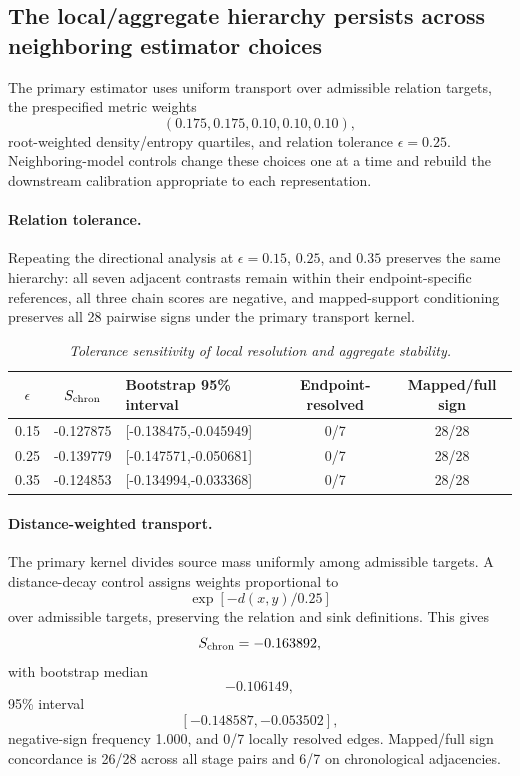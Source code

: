 \documentclass[11pt]{article}
\begin{document}
\subsection{The local/aggregate hierarchy persists across neighboring estimator choices}

The primary estimator uses uniform transport over admissible relation targets, the prespecified metric weights
\[
(0.175,0.175,0.10,0.10,0.10),
\]
root-weighted density/entropy quartiles, and relation tolerance $\epsilon=0.25$. Neighboring-model controls change these choices one at a time and rebuild the downstream calibration appropriate to each representation.

\paragraph{Relation tolerance.}
Repeating the directional analysis at $\epsilon=0.15$, $0.25$, and $0.35$ preserves the same hierarchy: all seven adjacent contrasts remain within their endpoint-specific references, all three chain scores are negative, and mapped-support conditioning preserves all 28 pairwise signs under the primary transport kernel.

\begin{table}[ht]
\centering
\caption{\textit{Tolerance sensitivity of local resolution and aggregate stability.}}
\label{tab:tolerance}
\begin{tabular}{cclcc}
\toprule
$\epsilon$ & $S_{\rm chron}$ & Bootstrap 95\% interval & Endpoint-resolved & Mapped/full sign\\
\midrule
0.15 & -0.127875 & [-0.138475,-0.045949] & 0/7 & 28/28\\
0.25 & -0.139779 & [-0.147571,-0.050681] & 0/7 & 28/28\\
0.35 & -0.124853 & [-0.134994,-0.033368] & 0/7 & 28/28\\
\bottomrule
\end{tabular}
\end{table}

\paragraph{Distance-weighted transport.}
The primary kernel divides source mass uniformly among admissible targets. A distance-decay control assigns weights proportional to
\[
\exp[-d(x,y)/0.25]
\]
over admissible targets, preserving the relation and sink definitions. This gives
\[
S_{\rm chron}=-0.163892,
\]
with bootstrap median
\[
-0.106149,
\]
95\% interval
\[
[-0.148587,-0.053502],
\]
negative-sign frequency 1.000, and 0/7 locally resolved edges. Mapped/full sign concordance is 26/28 across all stage pairs and 6/7 on chronological adjacencies.
\end{document}
